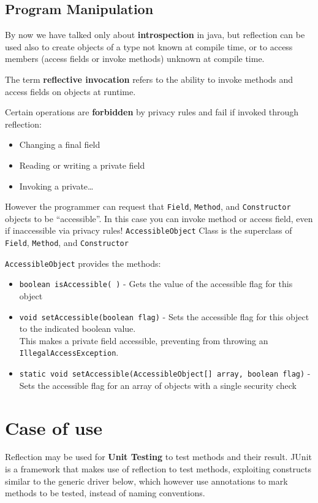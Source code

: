 \newpage
\subsection{Program Manipulation}
By now we have talked only about \textbf{introspection} in java,
but reflection can be used also to create objects of a type not known at compile time,
or to access members (access fields or invoke methods) unknown at compile time.

The term \textbf{reflective invocation} refers to the ability to invoke methods and access fields on objects at runtime.

{Certain operations are \textbf{forbidden} by privacy rules and fail if invoked through reflection:\ns
\begin{itemize}
	\item Changing a final field
	\item Reading or writing a private field
	\item Invoking a private\dots
\end{itemize}}

However the programmer can request that \texttt{Field}, \texttt{Method}, and
\texttt{Constructor} objects to be ``accessible''.
In this case you can invoke method or access field, even if
inaccessible via privacy rules!
\lstinline|AccessibleObject| Class is the superclass of \lstinline|Field|,
\lstinline|Method|, and \lstinline|Constructor|

{\lstinline|AccessibleObject| provides the methods:\ns
\begin{itemize}
	\item \lstinline|boolean isAccessible( )| - Gets the value of the accessible flag for this object
	\item \lstinline|void setAccessible(boolean flag)| - Sets the accessible flag for this object to the indicated boolean value.\\
	This makes a private field accessible, preventing from throwing an \lstinline|IllegalAccessException|.
	\item \lstinline|static void setAccessible(AccessibleObject[] array, boolean flag)| - Sets the accessible flag for an array of objects with a single security check
\end{itemize}}

\section{Case of use}
Reflection may be used for \textbf{Unit Testing} to test methods and their result. JUnit is a framework that makes use of reflection to test methods, exploiting constructs similar to the generic driver below, which however use annotations to mark methods to be tested, instead of naming conventions.

